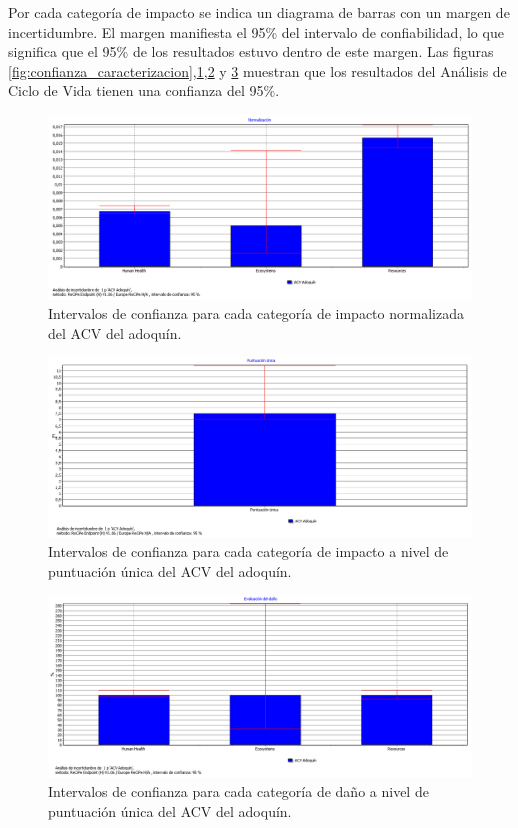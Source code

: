 Por cada categoría de impacto se indica un diagrama de barras con un margen de incertidumbre. El margen manifiesta el 95\% del intervalo de confiabilidad, lo que significa que el 95\% de los resultados estuvo dentro de este margen. Las figuras \ref{fig:confianza_caracterizacion},\ref{fig:confianza_normalizacion},\ref{fig:confianza_puntuacionunica} y \ref{fig:confianza_dano} muestran que los resultados del Análisis de Ciclo de Vida tienen una confianza del 95\%.

\begin{figure}[!htb]
\centering
\includegraphics[width=15cm]{img/confianza_normalizacion.png}
\caption{Intervalos de confianza para cada categoría de impacto normalizada del ACV del adoquín.}
\label{fig:confianza_normalizacion}
\end{figure}

\begin{figure}[!htb]
\centering
\includegraphics[width=15cm]{img/confianza_puntuacionunica.png}
\caption{Intervalos de confianza para cada categoría de impacto a nivel de puntuación única del ACV del adoquín.}
\label{fig:confianza_puntuacionunica}
\end{figure}

\begin{figure}[!htb]
\centering
\includegraphics[width=15cm]{img/confianza_dano.png}
\caption{Intervalos de confianza para cada categoría de daño a nivel de puntuación única del ACV del adoquín.}
\label{fig:confianza_dano}
\end{figure}


